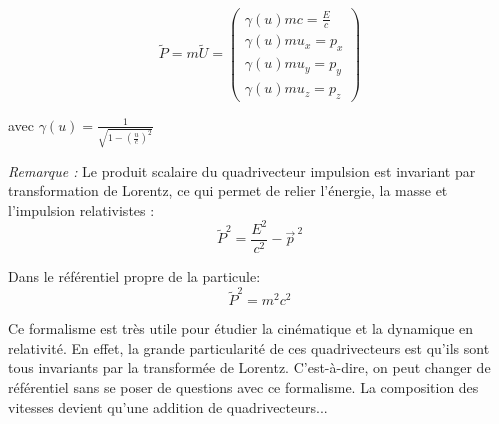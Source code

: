 \documentclass[14pt]{article}
\begin{document}
\begin{equation}\label{eq:4.3}
    \tilde{P} = m \tilde{U} = \begin{pmatrix}
        \gamma(u) m c = \frac{E}{c}\\
        \gamma(u) m u_x = p_x\\
        \gamma(u) m u_y = p_y\\
        \gamma(u) m u_z = p_z
    \end{pmatrix}
    \tag{4.3}
\end{equation}

avec $\gamma(u)= \frac{1}{\sqrt{1-(\frac{u}{c})^2}}$

\textit{Remarque :} Le produit scalaire du quadrivecteur impulsion est invariant par transformation de Lorentz, ce qui permet de relier l'énergie, la masse et l'impulsion relativistes :
\begin{equation}\label{eq:4.3.1}
    \tilde{P}^2 = \frac{E^2}{c^2} - \vec{p}^{\ 2}
    \tag{4.3.1}
\end{equation}

Dans le référentiel propre de la particule:
\begin{equation}\label{eq:4.3.2}
    \tilde{P}^2 = m^2 c^2
    \tag{4.3.2}
\end{equation}

Ce formalisme est très utile pour étudier la cinématique et la dynamique en relativité. En effet, la grande particularité de ces quadrivecteurs est qu'ils sont tous invariants par la transformée de Lorentz. C'est-à-dire, on peut changer de référentiel sans se poser de questions avec ce formalisme. La composition des vitesses devient qu'une addition de quadrivecteurs...
\end{document}
